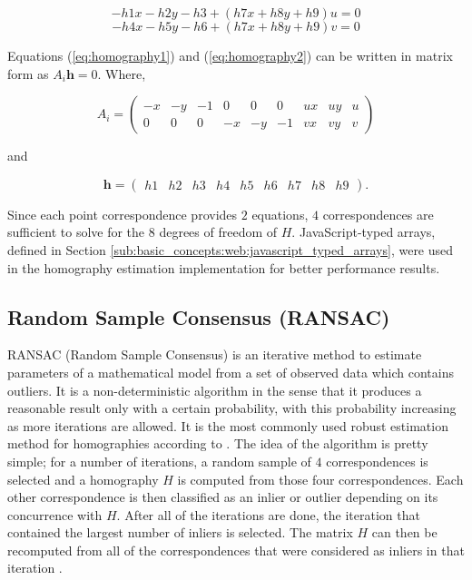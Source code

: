\begin{equation}
\label{eq:homography1}
-h1x-h2y-h3 +(h7x+h8y+h9)u=0
\end{equation}
\begin{equation}
\label{eq:homography2}
-h4x-h5y-h6 +(h7x+h8y+h9)v=0
\end{equation}

Equations (\ref{eq:homography1}) and (\ref{eq:homography2}) can be written in matrix form as $A_i\textbf{h}=0$. Where,

$$A_i=\begin{pmatrix}-x & -y & -1 & 0 & 0 & 0 & ux & uy & u\\0 & 0 & 0 & -x & -y & -1 & vx & vy & v\end{pmatrix}$$

and

$$\textbf{h}=\begin{pmatrix}h1 & h2 & h3 & h4 & h5 & h6 & h7 & h8 & h9\end{pmatrix}.$$

Since each point correspondence provides $2$ equations, $4$ correspondences are sufficient to solve for the $8$ degrees of freedom of $H$. JavaScript-typed arrays, defined in Section \ref{sub:basic_concepts:web:javascript_typed_arrays}, were used in the homography estimation implementation for better performance results.


\subsection{Random Sample Consensus (RANSAC)} %
\label{sub:tracking_library_for_the_web:marker_less_tracking_algorithm:ransac}

RANSAC (Random Sample Consensus) \cite{Hartley2004} is an iterative method to estimate parameters of a mathematical model from a set of observed data which contains outliers. It is a non-deterministic algorithm in the sense that it produces a reasonable result only with a certain probability, with this probability increasing as more iterations are allowed. It is the most commonly used robust estimation method for homographies according to \cite{Homography2009}. The idea of the algorithm is pretty simple; for a number of iterations, a random sample of $4$ correspondences is selected and a homography $H$ is computed from those four correspondences. Each other correspondence is then classified as an inlier or outlier depending on its concurrence with $H$. After all of the iterations are done, the iteration that contained the largest number of inliers is selected. The matrix $H$ can then be recomputed from all of the correspondences that were considered as inliers in that iteration \cite{Homography2009}.

